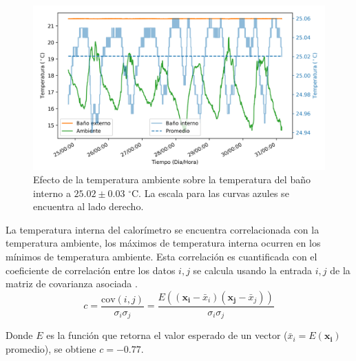 \documentclass[a0]{sciposter}
\newcommand{\grad}{$^\circ$C}
\newcommand{\figwidth}{0.7\linewidth}
\begin{document}
\begin{multicols}{3}
	\begin{figure}[h]
		\centering
		\includegraphics[width=\figwidth]{../Data/TemperatureStability/temperatureStability}
		\caption{Efecto de la temperatura ambiente sobre la temperatura del baño interno a $25.02\pm0.03$ \grad{}. La escala para las curvas azules se encuentra al lado derecho.}
	\end{figure}
	
	La temperatura interna del calorímetro se encuentra correlacionada con la temperatura ambiente, los máximos de temperatura interna ocurren en los mínimos de temperatura ambiente. Esta correlaci\'on es cuantificada con el coeficiente de correlaci\'on entre los datos $i, j$ se calcula usando la entrada $i,j$ de la matriz de covarianza asociada \cite{landau2008survey}.
	\begin{equation}
		c = \dfrac{\text{cov}(i, j)}{\sigma_i\sigma_j} = \dfrac{E((\mathbf{x_i} - 	\bar{x}_i)(\mathbf{x_j} - \bar{x}_j))}{\sigma_i\sigma_j}
	\end{equation}
	
	Donde $E$ es la funci\'on que retorna el valor esperado de un vector ($\bar{x}_i = E(\mathbf{x_i})$ promedio), se obtiene $c = -0.77$. 


\end{multicols}
\end{document}
